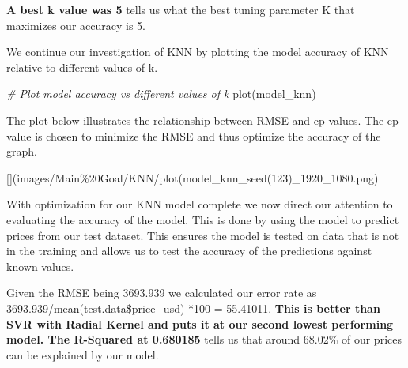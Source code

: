 \documentclass[
]{article}
\newenvironment{Shaded}{\begin{snugshade}}{\end{snugshade}}
\newcommand{\CommentTok}[1]{\textcolor[rgb]{0.56,0.35,0.01}{\textit{#1}}}
\newcommand{\FunctionTok}[1]{\textcolor[rgb]{0.00,0.00,0.00}{#1}}
\newcommand{\NormalTok}[1]{#1}
\newcommand{\OtherTok}[1]{\textcolor[rgb]{0.56,0.35,0.01}{#1}}
\newcommand{\SpecialCharTok}[1]{\textcolor[rgb]{0.00,0.00,0.00}{#1}}
\begin{document}
\textbf{A best k value was 5} tells us what the best tuning parameter K
that maximizes our accuracy is 5.

We continue our investigation of KNN by plotting the model accuracy of
KNN relative to different values of k.

\begin{Shaded}
\begin{Highlighting}[]
\CommentTok{\# Plot model accuracy vs different values of k}
\FunctionTok{plot}\NormalTok{(model\_knn)}
\end{Highlighting}
\end{Shaded}

The plot below illustrates the relationship between RMSE and cp values.
The cp value is chosen to minimize the RMSE and thus optimize the
accuracy of the graph.

{[}{]}(images/Main\%20Goal/KNN/plot(model\_knn\_seed(123)\_1920\_1080.png)

With optimization for our KNN model complete we now direct our attention
to evaluating the accuracy of the model. This is done by using the model
to predict prices from our test dataset. This ensures the model is
tested on data that is not in the training and allows us to test the
accuracy of the predictions against known values.

\begin{Shaded}
\end{Shaded}

Given the RMSE being 3693.939 we calculated our error rate as
3693.939/mean(test.data\$price\_usd) *100 = 55.41011. \textbf{This is
better than SVR with Radial Kernel and puts it at our second lowest
performing model. The R-Squared at 0.680185} tells us that around
68.02\% of our prices can be explained by our model.
\end{document}
